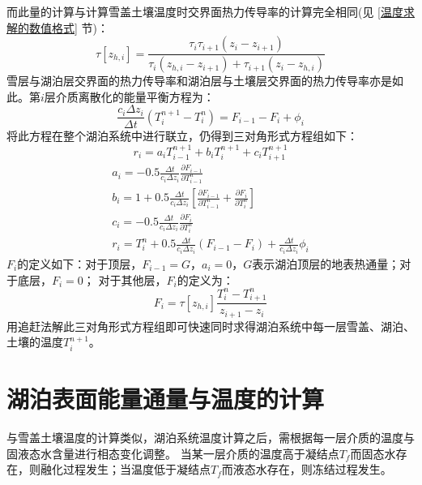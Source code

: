 而此量的计算与计算雪盖土壤温度时交界面热力传导率的计算完全相同(见 \ref{温度求解的数值格式} 节)：
\begin{equation}
    \tau\left[z_{h,i}\right]=\frac{\tau_i\tau_{i+1}\left(z_i-z_{i+1}\right)}{\tau_i\left(z_{h,i}-z_{i+1}\right)
    +\tau_{i+1}\left(z_i-z_{h,i}\right)}
\end{equation}
雪层与湖泊层交界面的热力传导率和湖泊层与土壤层交界面的热力传导率亦是如此。第$i$层介质离散化的能量平衡方程为：
\begin{equation}
\frac{c_{i} \Delta z_{i}}{\Delta t}\left(T_{i}^{n+1}-T_{i}^{n}\right)=F_{i-1}-F_{i}+\phi_{i}
\end{equation}
将此方程在整个湖泊系统中进行联立，仍得到三对角形式方程组如下：
\begin{equation}
r_{i}=a_{i} T_{i-1}^{n+1}+b_{i} T_{i}^{n+1}+c_{i} T_{i+1}^{n+1}
\end{equation}
\begin{equation}
\begin{array}{c}a_{i}=-0.5 \frac{\Delta t}{c_{i} \Delta z_{i}}
     \frac{\partial F_{i-1}}{\partial T_{i-1}^{n}} \\ b_{i}=1+0.5 \frac{\Delta t}{c_{i} \Delta z_{i}}
     \left[\frac{\partial F_{i-1}}{\partial T_{i-1}^{n}}+\frac{\partial F_{i}}{\partial T_{i}^{n}}\right] \\
      c_{i}=-0.5 \frac{\Delta t}{c_{i} \Delta z_{i}} \frac{\partial F_{i}}{\partial T_{i}^{n}} \\ 
      r_{i}=T_{i}^{n}+0.5 \frac{\Delta t}{c_{i} \Delta z_{i}}\left(F_{i-1}-F_{i}\right)+\frac{\Delta t}{c_{i}
       \Delta z_{i}} \phi_{i}\end{array}
\end{equation}
$F_i$的定义如下：对于顶层，$F_{i-1}=G$，$a_i=0$，$G$表示湖泊顶层的地表热通量；对于底层，$F_i=0$；
对于其他层，$F_i$的定义为：
\begin{equation}
F_{i}=\tau\left[z_{h, i}\right] \frac{T_{i}^{n}-T_{i+1}^{n}}{z_{i+1}-z_{i}}
\end{equation}
用追赶法解此三对角形式方程组即可快速同时求得湖泊系统中每一层雪盖、湖泊、土壤的温度$T_i^{n+1}$。
\section{湖泊表面能量通量与温度的计算}\label{湖泊表面能量通量与温度的计算}
与雪盖土壤温度的计算类似，湖泊系统温度计算之后，需根据每一层介质的温度与固液态水含量进行相态变化调整。
当某一层介质的温度高于凝结点$T_f$而固态水存在，则融化过程发生；当温度低于凝结点$T_f$而液态水存在，则冻结过程发生。

